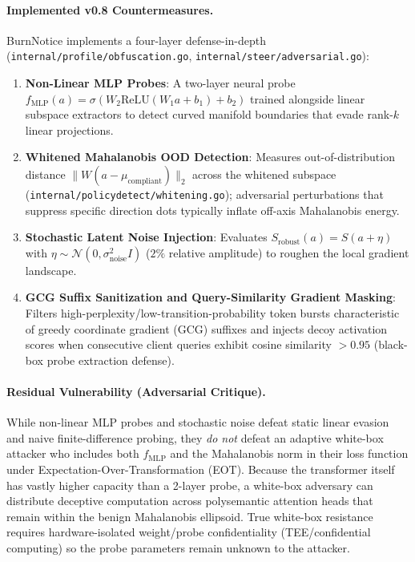\documentclass{article}
\begin{document}
\paragraph{Implemented v0.8 Countermeasures.}
BurnNotice implements a four-layer defense-in-depth (\texttt{internal/profile/obfuscation.go}, \texttt{internal/steer/adversarial.go}):
\begin{enumerate}
    \item \textbf{Non-Linear MLP Probes}: A two-layer neural probe $f_{\text{MLP}}(a) = \sigma(W_2 \text{ReLU}(W_1 a + b_1) + b_2)$ trained alongside linear subspace extractors to detect curved manifold boundaries that evade rank-$k$ linear projections.
    \item \textbf{Whitened Mahalanobis OOD Detection}: Measures out-of-distribution distance $\|W(a - \mu_{\text{compliant}})\|_2$ across the whitened subspace (\texttt{internal/policydetect/whitening.go}); adversarial perturbations that suppress specific direction dots typically inflate off-axis Mahalanobis energy.
    \item \textbf{Stochastic Latent Noise Injection}: Evaluates $S_{\text{robust}}(a) = S(a + \eta)$ with $\eta \sim \mathcal{N}(0, \sigma_{\text{noise}}^2 I)$ ($2\%$ relative amplitude) to roughen the local gradient landscape.
    \item \textbf{GCG Suffix Sanitization and Query-Similarity Gradient Masking}: Filters high-perplexity/low-transition-probability token bursts characteristic of greedy coordinate gradient (GCG) suffixes and injects decoy activation scores when consecutive client queries exhibit cosine similarity $> 0.95$ (black-box probe extraction defense).
\end{enumerate}

\paragraph{Residual Vulnerability (Adversarial Critique).}
While non-linear MLP probes and stochastic noise defeat static linear evasion and naive finite-difference probing, they \textit{do not} defeat an adaptive white-box attacker who includes both $f_{\text{MLP}}$ and the Mahalanobis norm in their loss function under Expectation-Over-Transformation (EOT). Because the transformer itself has vastly higher capacity than a 2-layer probe, a white-box adversary can distribute deceptive computation across polysemantic attention heads that remain within the benign Mahalanobis ellipsoid. True white-box resistance requires hardware-isolated weight/probe confidentiality (TEE/confidential computing) so the probe parameters remain unknown to the attacker.
\end{document}
